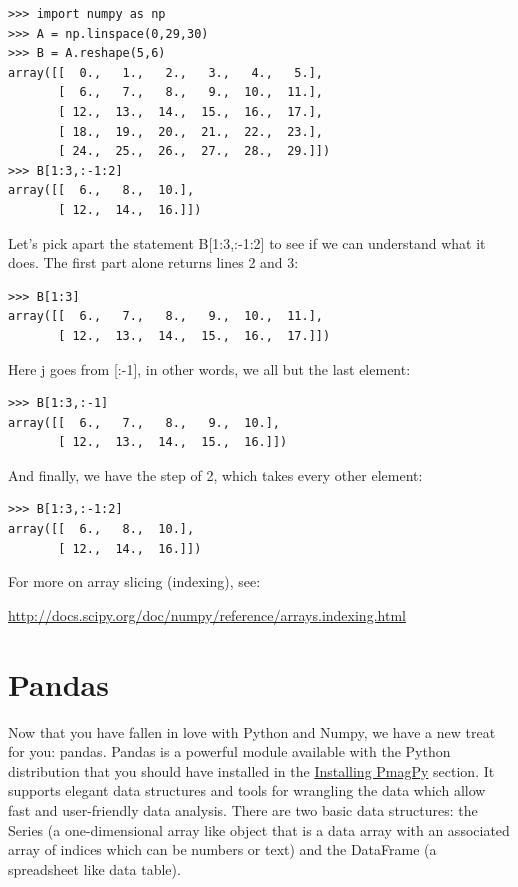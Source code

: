 \documentclass[11pt]{book}
\begin{document}
{{{{{ \color{blue} \begin{verbatim}
>>> import numpy as np
>>> A = np.linspace(0,29,30)
>>> B = A.reshape(5,6)
array([[  0.,   1.,   2.,   3.,   4.,   5.],
       [  6.,   7.,   8.,   9.,  10.,  11.],
       [ 12.,  13.,  14.,  15.,  16.,  17.],
       [ 18.,  19.,  20.,  21.,  22.,  23.],
       [ 24.,  25.,  26.,  27.,  28.,  29.]])
>>> B[1:3,:-1:2]
array([[  6.,   8.,  10.],
       [ 12.,  14.,  16.]])
\end{verbatim}}

Let's pick apart the statement {\color{blue}B[1:3,:-1:2]} to see if we can understand what it does.  The first part alone returns lines 2 and 3:
{ \color{blue} \begin{verbatim}
>>> B[1:3]
array([[  6.,   7.,   8.,   9.,  10.,  11.],
       [ 12.,  13.,  14.,  15.,  16.,  17.]])
\end{verbatim}}

Here  {\color{blue}j} goes from [:-1], in other words, we all but the last element:

{ \color{blue} \begin{verbatim}
>>> B[1:3,:-1]
array([[  6.,   7.,   8.,   9.,  10.],
       [ 12.,  13.,  14.,  15.,  16.]])
\end{verbatim}}

\noindent And finally, we have the step of 2, which takes every other element:

{ \color{blue} \begin{verbatim}
>>> B[1:3,:-1:2]
array([[  6.,   8.,  10.],
       [ 12.,  14.,  16.]])
\end{verbatim}}

\noindent For more on array slicing (indexing), see:

\url{http://docs.scipy.org/doc/numpy/reference/arrays.indexing.html}


\section{Pandas}

Now that you have fallen in love with Python and Numpy, we have a new treat for you:  pandas.  Pandas is a powerful module available with the Python distribution that you should have installed in the \href{#quick_start}{Installing PmagPy} section.  It supports elegant data structures and tools for wrangling the data which allow fast and user-friendly data analysis.  There are two basic data structures:  the Series (a one-dimensional array like object that is a data array with an associated array of indices which can be numbers or text) and the DataFrame (a spreadsheet like data table).

}}}}
\end{document}
